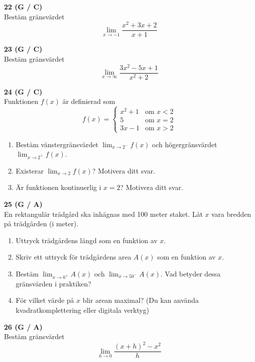 \documentclass[12pt]{article}
\begin{document}
\vspace{0.5cm}

\noindent
\textbf{22 (G / C)} \\
Bestäm gränsvärdet
\[
\lim_{x \to -1} \frac{x^2 + 3x + 2}{x + 1}
\]

\vspace{0.5cm}

\noindent
\textbf{23 (G / C)} \\
Bestäm gränsvärdet
\[
\lim_{x \to \infty} \frac{3x^2 - 5x + 1}{x^2 + 2}
\]

\vspace{0.5cm}

\noindent
\textbf{24 (G / C)} \\
Funktionen $f(x)$ är definierad som
\[
f(x) = \begin{cases}
x^2 + 1 & \text{om } x < 2 \\
5 & \text{om } x = 2 \\
3x - 1 & \text{om } x > 2
\end{cases}
\]

\begin{enumerate}[label=\alph*)]
    \item Bestäm vänstergränsvärdet $\lim_{x \to 2^-} f(x)$ och högergränsvärdet $\lim_{x \to 2^+} f(x)$.
    \item Existerar $\lim_{x \to 2} f(x)$? Motivera ditt svar.
    \item Är funktionen kontinuerlig i $x = 2$? Motivera ditt svar.
\end{enumerate}

\vspace{0.5cm}

\noindent
\textbf{25 (G / A)} \\
En rektangulär trädgård ska inhägnas med 100 meter staket. Låt $x$ vara bredden på trädgården (i meter).

\begin{enumerate}[label=\alph*)]
    \item Uttryck trädgårdens längd som en funktion av $x$.
    \item Skriv ett uttryck för trädgårdens area $A(x)$ som en funktion av $x$.
    \item Bestäm $\lim_{x \to 0^+} A(x)$ och $\lim_{x \to 50^-} A(x)$. Vad betyder dessa gränsvärden i praktiken?
    \item För vilket värde på $x$ blir arean maximal? (Du kan använda kvadratkomplettering eller digitala verktyg)
\end{enumerate}

\vspace{0.5cm}

\noindent
\textbf{26 (G / A)} \\
Bestäm gränsvärdet
\[
\lim_{h \to 0} \frac{(x + h)^2 - x^2}{h}
\]
\end{document}

